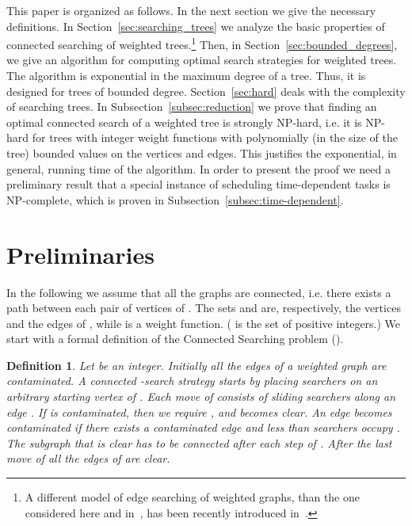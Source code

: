 \documentclass[10pt]{article}
\newtheorem{definition}{Definition}
\begin{document}
This paper is organized as follows. In the next section we give the necessary definitions. In Section~\ref{sec:searching_trees} we analyze the basic properties of connected searching of weighted trees.\footnote{A different model of edge searching of weighted graphs, than the one considered here and in~\cite{connected_weighted_trees}, has been recently introduced in~\cite{edge_searching_weighted_graphs}.} Then, in Section~\ref{sec:bounded_degrees}, we give an algorithm for computing optimal search strategies for weighted trees. The algorithm is exponential in the maximum degree of a tree. Thus, it is designed for trees of bounded degree. Section~\ref{sec:hard} deals with the complexity of searching trees. In Subsection~\ref{subsec:reduction} we prove that finding an optimal connected search of a weighted tree is strongly NP-hard, i.e. it is NP-hard for trees with integer weight functions with polynomially (in the size of the tree) bounded values on the vertices and edges. This justifies the exponential, in general, running time of the algorithm. In order to present the proof we need a preliminary result that a special instance of scheduling time-dependent tasks is NP-complete, which is proven in Subsection~\ref{subsec:time-dependent}.


\section{Preliminaries}
\label{sec:preliminaries}

In the following we assume that all the graphs  are connected, i.e. there exists a path between each pair of vertices of . The sets  and  are, respectively, the vertices and the edges of , while  is a weight function. ( is the set of positive integers.) We start with a formal definition of the Connected Searching problem ().

\begin{definition}
Let  be an integer. Initially all the edges of a weighted graph  are \emph{contaminated}. A \emph{connected -search strategy}  starts by placing  searchers on an arbitrary \emph{starting vertex}  of . Each move of  consists of sliding  searchers along an edge . If  is contaminated, then we require , and  becomes \emph{clear}. An edge  becomes \emph{contaminated} if there exists a contaminated edge  and less than  searchers occupy . The subgraph that is clear has to be connected after each step of . After the last move of  all the edges of  are clear.
\end{definition}
\end{document}
